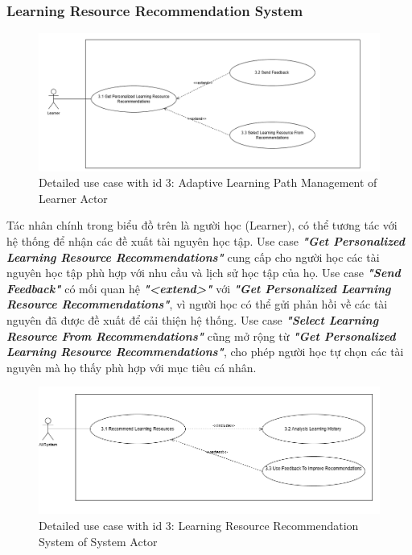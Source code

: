 \subsubsection{Learning Resource Recommendation System}
\begin{figure}[H]
    \centering
    \includegraphics[scale=0.45]{Images/Usecase/usecase-Learning Resource Recommendation System - Learner.drawio.png}
    \caption{Detailed use case with id 3: Adaptive Learning Path Management of Learner Actor}
    \label{fig:enter-label}
\end{figure}
\quad Tác nhân chính trong biểu đồ trên là người học (Learner), có thể tương tác với hệ thống để nhận các đề xuất tài nguyên học tập. Use case \textbf{\textit{"Get Personalized Learning Resource Recommendations"}} cung cấp cho người học các tài nguyên học tập phù hợp với nhu cầu và lịch sử học tập của họ. Use case \textbf{\textit{"Send Feedback"}} có mối quan hệ \textbf{\textit{"<extend>"}} với \textbf{\textit{"Get Personalized Learning Resource Recommendations"}}, vì người học có thể gửi phản hồi về các tài nguyên đã được đề xuất để cải thiện hệ thống.
Use case \textbf{\textit{"Select Learning Resource From Recommendations"}} cũng mở rộng từ \textbf{\textit{"Get Personalized Learning Resource Recommendations"}}, cho phép người học tự chọn các tài nguyên mà họ thấy phù hợp với mục tiêu cá nhân.
\begin{figure}[H]
    \centering
    \includegraphics[scale=0.45]{Images/Usecase/usecase-Learning Resource Recommendation System - System.drawio.png}
    \caption{Detailed use case with id 3: Learning Resource Recommendation System of System Actor}
    \label{fig:enter-label}
\end{figure}
